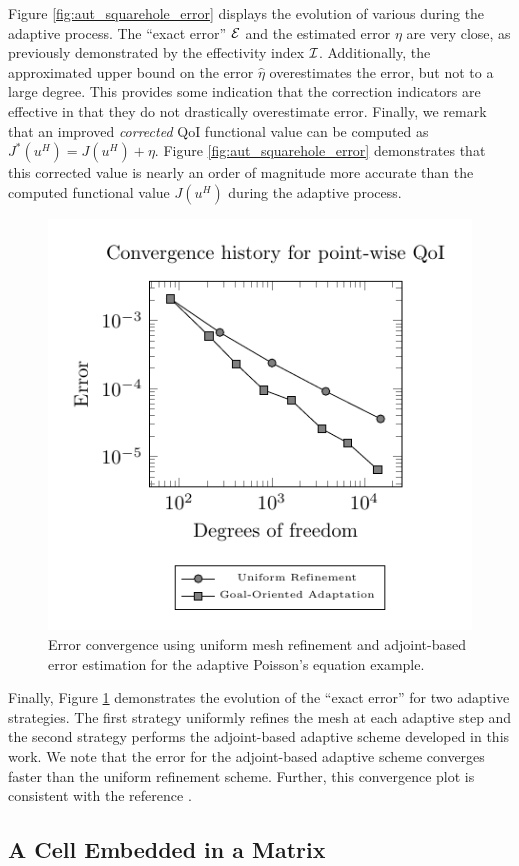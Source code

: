 Figure \ref{fig:aut_squarehole_error} displays the evolution of
various during the adaptive process. The ``exact error'' $\mathcal{E}$
and the estimated error $\eta$ are very close, as previously
demonstrated by the effectivity index $\mathcal{I}$. Additionally, the
approximated upper bound on the error $\hat{\eta}$ overestimates
the error, but not to a large degree. This provides some indication
that the correction indicators are effective in that they do
not drastically overestimate error. Finally, we remark that an
improved \emph{corrected} QoI functional value can be
computed as $J^*(u^H) = J(u^H) + \eta$. Figure
\ref{fig:aut_squarehole_error} demonstrates that this corrected
value is nearly an order of magnitude more accurate than
the computed functional value $J(u^H)$ during the adaptive process.

%
\begin{figure}[ht!]
\centering
\includegraphics[width=.5\textwidth]{img/aut_squarehole_convergence.pdf}
\caption{Error convergence using uniform mesh refinement and adjoint-based
error estimation for the adaptive Poisson's equation example.}
\label{fig:aut_squarehole_convergence}
\end{figure}

Finally, Figure \ref{fig:aut_squarehole_convergence} demonstrates the
evolution of the ``exact error'' for two adaptive strategies.
The first strategy uniformly refines the mesh at each adaptive
step and the second strategy performs the adjoint-based adaptive scheme
developed in this work. We note that the error for the adjoint-based
adaptive scheme converges faster than the uniform refinement scheme.
Further, this convergence plot is consistent with the reference
\cite{dealiistep14}. 

\subsection{A Cell Embedded in a Matrix}

